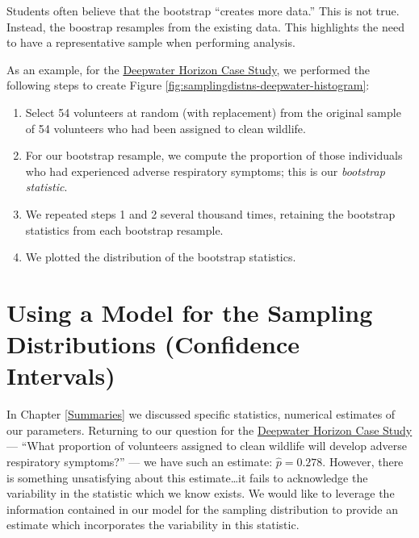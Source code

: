 \documentclass[
]{book}
\providecommand{\tightlist}{%
  \setlength{\itemsep}{0pt}\setlength{\parskip}{0pt}}
\theoremstyle{plain}
\theoremstyle{mydefn}
\theoremstyle{myexmpl}
\theoremstyle{remark}
\begin{document}
\begin{rmdtip}
Students often believe that the bootstrap ``creates more data.'' This is not true. Instead, the boostrap resamples from the existing data. This highlights the need to have a representative sample when performing analysis.
\end{rmdtip}

As an example, for the \protect\hyperlink{CaseDeepwater}{Deepwater Horizon Case Study}, we performed the following steps to create Figure \ref{fig:samplingdistns-deepwater-histogram}:

\begin{enumerate}
\def\labelenumi{\arabic{enumi}.}
\tightlist
\item
  Select 54 volunteers at random (with replacement) from the original sample of 54 volunteers who had been assigned to clean wildlife.
\item
  For our bootstrap resample, we compute the proportion of those individuals who had experienced adverse respiratory symptoms; this is our \emph{bootstrap statistic}.
\item
  We repeated steps 1 and 2 several thousand times, retaining the bootstrap statistics from each bootstrap resample.
\item
  We plotted the distribution of the bootstrap statistics.
\end{enumerate}

\hypertarget{using-a-model-for-the-sampling-distributions-confidence-intervals}{%
\section{Using a Model for the Sampling Distributions (Confidence Intervals)}\label{using-a-model-for-the-sampling-distributions-confidence-intervals}}

In Chapter \ref{Summaries} we discussed specific statistics, numerical estimates of our parameters. Returning to our question for the \protect\hyperlink{CaseDeepwater}{Deepwater Horizon Case Study} --- ``What proportion of volunteers assigned to clean wildlife will develop adverse respiratory symptoms?'' --- we have such an estimate: \(\widehat{p} = 0.278\). However, there is something unsatisfying about this estimate\ldots it fails to acknowledge the variability in the statistic which we know exists. We would like to leverage the information contained in our model for the sampling distribution to provide an estimate which incorporates the variability in this statistic.
\end{document}
